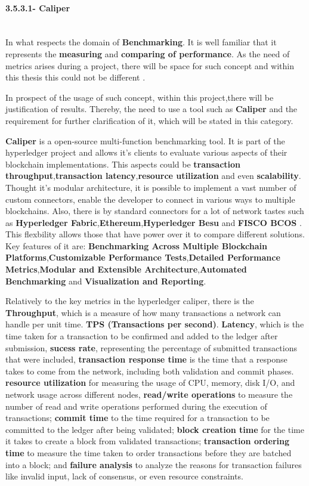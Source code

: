 \paragraph{3.5.3.1- Caliper}\mbox{}\\
In what respects the domain of \textbf{Benchmarking}. It is well familiar that it represents the \textbf{measuring} and \textbf{comparing of performance}. As the need of metrics arises during a project, there will be space for such concept and within this thesis this could not be different \cite{caliper}.

In prospect of the usage of such concept, within this project,there will be justification of results. Thereby, the need to use a tool such as \textbf{Caliper} and the requirement for further clarification of it, which will be stated in this category.

\textbf{Caliper} \cite{HyperledgerCaliper} is a open-source multi-function benchmarking tool. It is part of the hyperledger project and allows it's clients to evaluate various aspects of their blockchain implementations. This aspects could be \textbf{transaction throughput},\textbf{transaction latency},\textbf{resource utilization} and even \textbf{scalability}. Thought it's modular architecture, it is possible to implement a vast number of custom connectors, enable the developer to connect in various ways to multiple blockchains. Also, there is by standard connectors for a lot of network tastes such as \textbf{Hyperledger Fabric},\textbf{Ethereum},\textbf{Hyperledger Besu} \cite{HyperledgerBesu} and \textbf{FISCO BCOS} \cite{FISCOBCOS}. This flexbility allows those that have power over it to compare different solutions. Key features of it are: \textbf{Benchmarking Across Multiple Blockchain Platforms},\textbf{Customizable Performance Tests},\textbf{Detailed Performance Metrics},\textbf{Modular and Extensible Architecture},\textbf{Automated Benchmarking} and \textbf{Visualization and Reporting}.

Relatively to the key metrics in the hyperledger caliper, there is the \textbf{Throughput}, which is a measure of how many transactions a network can handle per unit time. \textbf{TPS (Transactions per second)}. \textbf{Latency}, which is the time taken for a transaction to be confirmed and added to the ledger after submission, \textbf{sucess rate}, representing the percentage of submitted transactions that were included, \textbf{transaction response time} is the time that a response takes to come from the network, including both validation and commit phases. \textbf{resource utilization} for measuring the usage of CPU, memory, disk I/O, and network usage across different nodes, \textbf{read/write operations} to measure the number of read and write operations performed during the execution of transactions; \textbf{commit time} to the time required for a transaction to be committed to the ledger after being validated; \textbf{block creation time} for the time it takes to create a block from validated transactions; \textbf{transaction ordering time} to measure the time taken to order transactions before they are batched into a block; and \textbf{failure analysis} to analyze the reasons for transaction failures like invalid input, lack of consensus, or even resource constraints.

